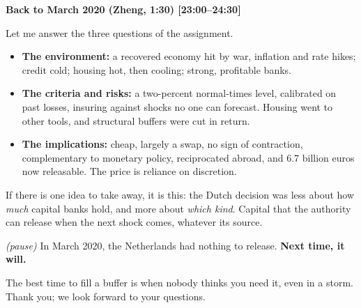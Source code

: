 {\small\textbf{Back to March 2020 (Zheng, 1:30) [23:00–24:30]}}\par\smallskip
Let me answer the three questions of the assignment.
\begin{itemize}\setlength\itemsep{0pt}
\item \textbf{The environment:} a recovered economy hit by war, inflation and rate hikes; credit cold; housing hot, then cooling; strong, profitable banks.
\item \textbf{The criteria and risks:} a two-percent normal-times level, calibrated on past losses, insuring against shocks no one can forecast. Housing went to other tools, and structural buffers were cut in return.
\item \textbf{The implications:} cheap, largely a swap, no sign of contraction, complementary to monetary policy, reciprocated abroad, and 6.7 billion euros now releasable. The price is reliance on discretion.
\end{itemize}
\par\smallskip
If there is one idea to take away, it is this: the Dutch decision was less about how \emph{much} capital banks hold, and more about \emph{which kind}. Capital that the authority can release when the next shock comes, whatever its source.
\par\smallskip
\emph{(pause)} In March 2020, the Netherlands had nothing to release. \textbf{Next time, it will.}
\par\smallskip
The best time to fill a buffer is when nobody thinks you need it, even in a storm. Thank you; we look forward to your questions.
